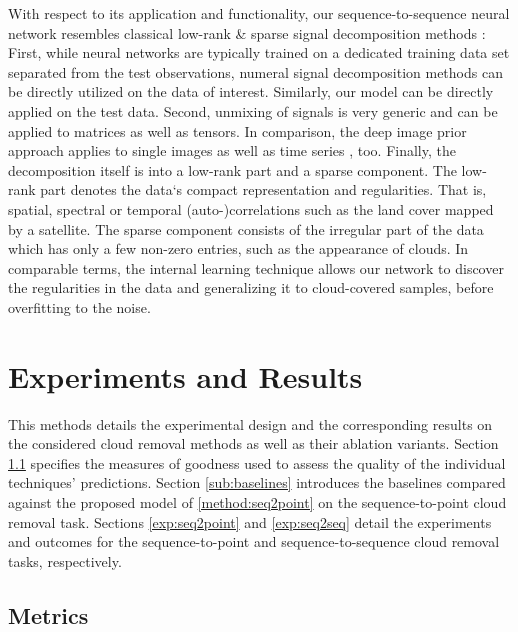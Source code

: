 \documentclass[journal]{IEEEtran}
\begin{document}
With respect to its application and functionality, our sequence-to-sequence neural network resembles classical low-rank \& sparse signal decomposition methods \cite{de2001robust, donoho2006compressed, zhu2010tomographic, zhu2012sparse}: First, while neural networks are typically trained on a dedicated training data set separated from the test observations, numeral signal decomposition methods can be directly utilized on the data of interest. Similarly, our model can be directly applied on the test data. Second, unmixing of signals is very generic and can be applied to matrices as well as tensors. In comparison, the deep image prior approach applies to single images as well as time series \cite{ulyanov2018deep, zhang2019internal}, too. Finally, the decomposition itself is into a low-rank part and a sparse component. The low-rank part denotes the data‘s compact representation and regularities. That is, spatial, spectral or temporal (auto-)correlations such as the land cover mapped by a satellite. The sparse component consists of the irregular part of the data which has only a few non-zero entries, such as the appearance of clouds. In comparable terms, the internal learning technique allows our network to discover the regularities in the data and generalizing it to cloud-covered samples, before overfitting to the noise. 


\section{Experiments and Results} \label{experiments}

This methods details the experimental design and the corresponding results on the considered cloud removal methods as well as their ablation variants. 
Section \ref{sub:metrics} specifies the measures of goodness used to assess the quality of the individual techniques' predictions. Section \ref{sub:baselines} introduces the baselines compared against the proposed model of \ref{method:seq2point} on the sequence-to-point cloud removal task. Sections \ref{exp:seq2point} and \ref{exp:seq2seq} detail the experiments and outcomes for the sequence-to-point and sequence-to-sequence cloud removal tasks, respectively.

\subsection{Metrics} \label{sub:metrics}
\end{document}
